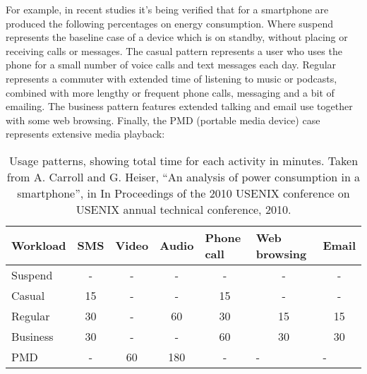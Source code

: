 \documentclass[conference]{IEEEtran}
\begin{document}
 For example, in recent studies \cite{Carroll_ananalysis} it's being verified that for a smartphone are produced the following percentages on energy consumption. Where suspend represents the baseline case of a device which is on standby, without placing or receiving calls or messages. The casual pattern represents a user who uses the phone for a small number of voice calls and text messages each day. Regular represents a commuter with extended time of listening to music or podcasts, combined with more lengthy or frequent phone calls, messaging and a bit of emailing. The business pattern features extended talking and email use together with some web browsing. Finally, the PMD (portable media device) case represents extensive media playback:
 
\begin{table}[h]
\begin{tabular}{|l|c|c|c|c|c|c|}
\hline
Workload & \multicolumn{1}{l|}{SMS} & \multicolumn{1}{l|}{Video} & \multicolumn{1}{l|}{Audio} & \multicolumn{1}{l|}{Phone call} & \multicolumn{1}{l|}{Web browsing} & \multicolumn{1}{l|}{Email} \\ \hline
Suspend  & -                        & -                          & -                          & -                               & -                                 & -                          \\ \hline
Casual   & 15                       & -                          & -                          & 15                              & -                                 & -                          \\ \hline
Regular  & 30                       & -                          & 60                         & 30                              & 15                                & 15                         \\ \hline
Business & 30                       & -                          & -                          & 60                              & 30                                & 30                         \\ \hline
PMD      & -                        & 60                         & 180                        & -                               & \multicolumn{1}{l|}{-}            & \multicolumn{1}{l|}{-}     \\ \hline
\end{tabular}
\caption {Usage patterns, showing total time for each activity in minutes. Taken from  A. Carroll and G. Heiser, ``An analysis of power consumption in a smartphone'', in In Proceedings of the 2010 USENIX conference on USENIX annual technical conference, 2010.}
\end{table}
  
\end{document}
